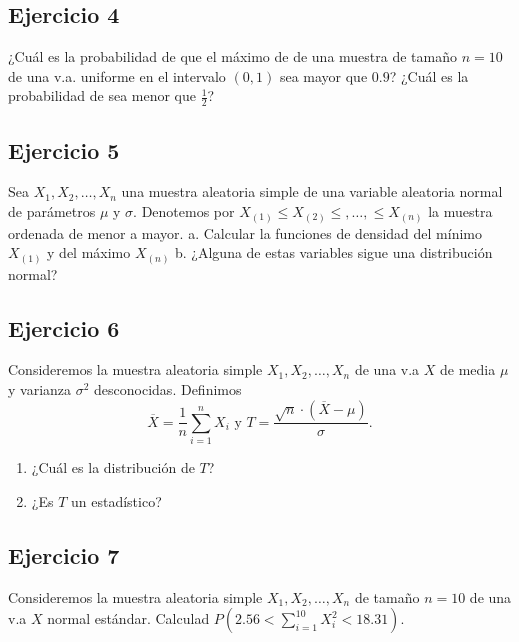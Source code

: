\documentclass[
]{article}
\providecommand{\tightlist}{%
  \setlength{\itemsep}{0pt}\setlength{\parskip}{0pt}}
\begin{document}
\hypertarget{ejercicio-4}{%
\subsection{Ejercicio 4}\label{ejercicio-4}}

¿Cuál es la probabilidad de que el máximo de de una muestra de tamaño
\(n=10\) de una v.a. uniforme en el intervalo \((0,1)\) sea mayor que
\(0.9\)? ¿Cuál es la probabilidad de sea menor que \(\frac12\)?

\hypertarget{ejercicio-5}{%
\subsection{Ejercicio 5}\label{ejercicio-5}}

Sea \(X_1,X_2,\ldots,X_n\) una muestra aleatoria simple de una variable
aleatoria normal de parámetros \(\mu\) y \(\sigma\). Denotemos por
\(X_{(1)}\leq X_{(2)}\leq ,\ldots,\leq X_{(n)}\) la muestra ordenada de
menor a mayor. a. Calcular la funciones de densidad del mínimo
\(X_{(1)}\) y del máximo \(X_{(n)}\) b. ¿Alguna de estas variables sigue
una distribución normal?

\hypertarget{ejercicio-6}{%
\subsection{Ejercicio 6}\label{ejercicio-6}}

Consideremos la muestra aleatoria simple \(X_1,X_2,\ldots,X_n\) de una
v.a \(X\) de media \(\mu\) y varianza \(\sigma^2\) desconocidas.
Definimos
\[\overline{X}=\frac1n \sum\limits_{i=1}^n X_i\mbox{ y } T=\frac{\sqrt{n}\cdot(\overline{X}-\mu)}{\sigma}.\]

\begin{enumerate}
\def\labelenumi{\alph{enumi}.}
\tightlist
\item
  ¿Cuál es la distribución de \(T\)?
\item
  ¿Es \(T\) un estadístico?
\end{enumerate}

\hypertarget{ejercicio-7}{%
\subsection{Ejercicio 7}\label{ejercicio-7}}

Consideremos la muestra aleatoria simple \(X_1,X_2,\ldots,X_n\) de
tamaño \(n=10\) de una v.a \(X\) normal estándar. Calculad
\(P\left(2.56<\sum\limits_{i=1}^{10} X_i^2 <18.31\right)\).
\end{document}
